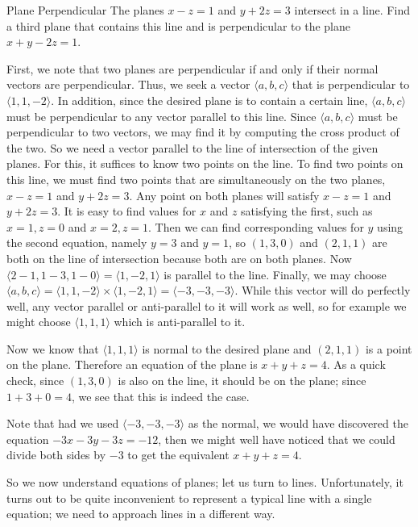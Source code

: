 \begin{example}{Plane Perpendicular}{}
The planes $x-z=1$ and $y+2z=3$ intersect in a line. Find a
third plane that contains this line and is perpendicular to the plane
$x+y-2z=1$.
\end{example} 
\begin{solution}
First, we note that two planes are perpendicular if and only if their
normal vectors are perpendicular. Thus, we seek a vector $\langle
a,b,c\rangle$ that is
perpendicular to $\langle 1,1,-2\rangle$. In addition, since the
desired plane is to contain a certain line, $\langle
a,b,c\rangle$ must be perpendicular to any vector parallel to this
line. Since $\langle
a,b,c\rangle$ must be perpendicular to two vectors, we may find it by
computing the cross product of the two. So we need a vector parallel
to the line of intersection of the given planes. For this, it suffices
to know two points on the line. To find two points on this line, we
must find two points that are simultaneously on the two planes, 
$x-z=1$ and $y+2z=3$. Any point on both planes will satisfy 
$x-z=1$ and $y+2z=3$. It is easy to find values for $x$ and $z$
satisfying the first, such as $x=1, z=0$ and $x=2, z=1$. Then
we can find corresponding values for $y$ using the second equation,
namely $y=3$ and $y=1$, so
$(1,3,0)$ and $(2,1,1)$ are both on the line
of intersection because both are on both planes. Now 
$\langle 2-1,1-3,1-0\rangle=\langle 1,-2,1\rangle$ is parallel to the
line. Finally, we may choose $\langle a,b,c\rangle=\langle
1,1,-2\rangle\times \langle 1,-2,1\rangle=\langle -3,-3,-3\rangle$.
While this vector will do perfectly well, any vector parallel or
anti-parallel to it will work as well, so for example we might choose
$\langle 1,1,1\rangle$ which is anti-parallel to it. 

Now we know that $\langle 1,1,1\rangle$ is normal to the desired plane
and $(2,1,1)$ is a point on the plane. Therefore an equation of the
plane is $x+y+z=4$. As a quick check, since $(1,3,0)$ is also on the
line, it should be on the plane; since $1+3+0=4$, we see that this is
indeed the case.

Note that had we used $\langle -3,-3,-3\rangle$ as the normal, we
would have discovered the equation $-3x-3y-3z=-12$, then we might well
have noticed that we could divide both sides by $-3$ to get the
equivalent $x+y+z=4$.
\end{solution}

So we now understand equations of planes; let us turn to
lines. Unfortunately, it turns out to be quite inconvenient to
represent a typical line with a single equation; we need to approach
lines in a different way.

